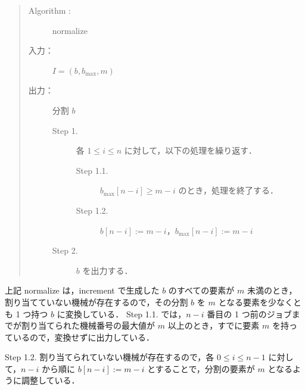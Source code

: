 \documentclass[12pt]{optlab-bachelor}
\begin{document}
\begin{quote}
  \begin{description}
    \item[{\sc Algorithm : }]  {\sc normalize}
    \item[入力：] $I = (b, b_{\max}, m)$
    \item[出力：] 分割 $b$
    \begin{description}
      \item[Step 1.] 各 $1 \le i \le n$ に対して，以下の処理を繰り返す．
      \begin{description}
        \item[Step 1.1.] $b_{\max}[n - i] \ge m - i$ のとき，処理を終了する．
        \item[Step 1.2.] $b[n - i] := m - i$，$b_{\max}[n - i] := m - i$
      \end{description}
      \item[Step 2.] $b$ を出力する．
    \end{description}
  \end{description}
\end{quote}

上記 {\sc normalize} は，{\sc increment} で生成した $b$ のすべての要素が $m$ 未満のとき，割り当てていない機械が存在するので，その分割 $b$ を $m$ となる要素を少なくとも 1 つ持つ $b$ に変換している．
Step 1.1. では，$n - i$ 番目の 1 つ前のジョブまでが割り当てられた機械番号の最大値が $m$ 以上のとき，すでに要素 $m$ を持っているので，変換せずに出力している．

Step 1.2. 割り当てられていない機械が存在するので，各 $0 \le i \le n - 1$ に対して，$n - i$ から順に $b[n-i] := m - i$ とすることで，分割の要素が $m$ となるように調整している．
\end{document}
